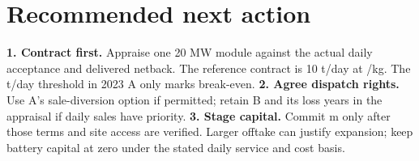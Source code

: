 \section{Recommended next action}
\textbf{1. Contract first.} Appraise one 20 MW module against the actual daily
acceptance and delivered netback. The reference contract is 10 t/day at
\gbp\Netback/kg. The \OfftakeBreak{} t/day threshold in 2023 A only marks
break-even. \textbf{2. Agree dispatch rights.} Use A's sale-diversion option
if permitted; retain B and its loss years in the appraisal if daily sales have
priority. \textbf{3. Stage capital.} Commit \gbp\Capital m only after those
terms and site access are verified. Larger offtake can justify expansion;
keep battery capital at zero under the stated daily service and cost basis.

